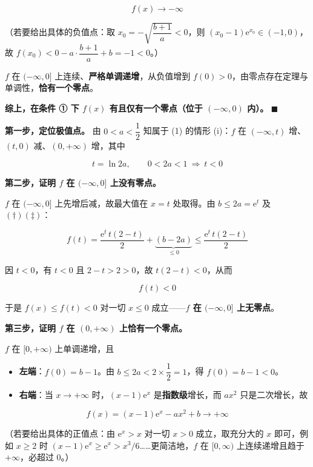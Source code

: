 \[f(x)\to-\infty\]

（若要给出具体的负值点：取 $x_0=-\sqrt{\dfrac{b+1}a}<0$，则 $(x_0-1)\mathrm e^{x_0}\in(-1,0)$，故 $f\left(x_0\right)<0-a\cdot\dfrac{b+1}a+b=-1<0$。）

$f$ 在 $(-\infty,0]$ 上连续、\textbf{严格单调递增}，从负值增到 $f(0)>0$，由零点存在定理与单调性，\textbf{恰有一个零点}。

\textbf{综上，在条件 ① 下 $f(x)$ 有且仅有一个零点（位于 $(-\infty,0)$ 内）。} $\blacksquare$

\par\medskip


\textbf{第一步，定位极值点。} 由 $0<a<\dfrac12$ 知属于 (1) 的情形 (i)：$f$ 在 $(-\infty,t)$ 增、$(t,0)$ 减、$(0,+\infty)$ 增，其中

\[t=\ln2a,\qquad 0<2a<1\ \Longrightarrow\ t<0\]

\textbf{第二步，证明 $f$ 在 $(-\infty,0]$ 上没有零点。}

$f$ 在 $(-\infty,0]$ 上先增后减，故最大值在 $x=t$ 处取得。由 $b\le2a=\mathrm e^{t}$ 及 $(\dagger)(\ddagger)$：

\[f(t)=\frac{\mathrm e^{t}\,t(2-t)}2+\underbrace{\left(b-2a\right)}_{\le0}\le\frac{\mathrm e^{t}\,t(2-t)}2\]

因 $t<0$，有 $t<0$ 且 $2-t>2>0$，故 $t(2-t)<0$，从而

\[f(t)<0\]

于是 $f(x)\le f(t)<0$ 对一切 $x\le0$ 成立——\textbf{$f$ 在 $(-\infty,0]$ 上无零点}。

\textbf{第三步，证明 $f$ 在 $(0,+\infty)$ 上恰有一个零点。}

$f$ 在 $[0,+\infty)$ 上单调递增，且

\begin{itemize}
\item \textbf{左端}：$f(0)=b-1$。由 $b\le2a<2\times\dfrac12=1$，得 $f(0)=b-1<0$。
\item \textbf{右端}：当 $x\to+\infty$ 时，$(x-1)\mathrm e^{x}$ 是\textbf{指数级}增长，而 $ax^{2}$ 只是二次增长，故
\end{itemize}

\[f(x)=(x-1)\mathrm e^{x}-ax^{2}+b\to+\infty\]

（若要给出具体的正值点：由 $\mathrm e^{x}>x$ 对一切 $x>0$ 成立，取充分大的 $x$ 即可，例如 $x\ge2$ 时 $(x-1)\mathrm e^{x}\ge\mathrm e^{x}>x^{3}/6$……更简洁地，$f$ 在 $[0,\infty)$ 上连续递增且趋于 $+\infty$，必超过 $0$。）

